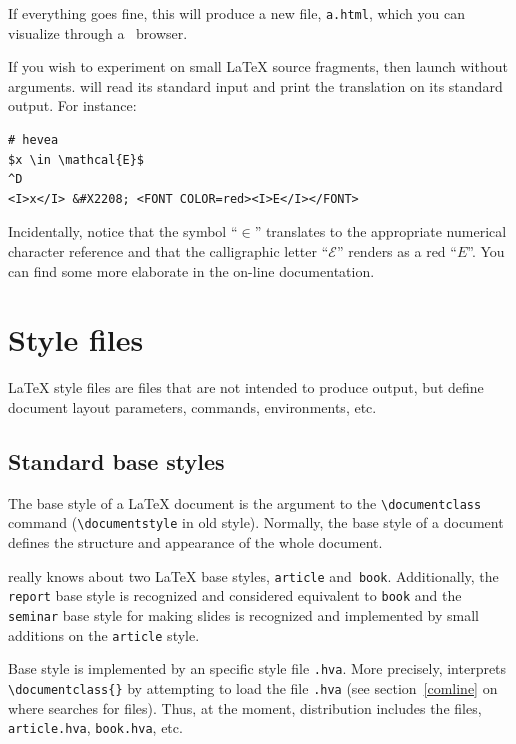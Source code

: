 If everything goes fine, this will produce a new file,
\texttt{a.html}, which you can visualize through  a {\html}~browser.


If you wish to experiment \hevea{} on small \LaTeX{} source fragments,
then launch \hevea{} without arguments. \hevea{} will read its
standard input and print the translation on its standard output.
For instance:
\begin{verbatim}
# hevea
$x \in \mathcal{E}$
^D
<I>x</I> &#X2208; <FONT COLOR=red><I>E</I></FONT>
\end{verbatim}
Incidentally, notice that the symbol ``$\in$'' translates to the
appropriate numerical character reference and that the calligraphic
letter ``$\mathcal{E}$'' renders as a red ``$E$''. You can find some
more elaborate  in
the on-line documentation.

\section{Style files}
\LaTeX{} style files are files that are not intended to produce output, but
define document layout parameters, commands, environments, etc.

\subsection{Standard base styles}

The base style of a \LaTeX{} document is the argument to the
\verb+\documentclass+ command (\verb+\documentstyle+ in old style).
Normally, the base style of a document defines the structure and
appearance of the whole document.



\noindent\hevea{} really knows about two \LaTeX{} base styles,
\texttt{article} and~\texttt{book}.
Additionally, the \texttt{report} base style is recognized and
considered equivalent to \texttt{book} and the
\texttt{seminar} base style for making slides is recognized and
implemented by small additions on the \texttt{article} style.


Base style  is implemented by an \hevea{} specific
style file \verb+.hva+.
More precisely, \hevea{} interprets
\verb+\documentclass{+\verb+}+ by attempting to load
the file \verb+.hva+ (see section~\ref{comline} on where
\hevea{} searches for files).
Thus, at the moment, \hevea{} distribution includes the files,
\texttt{article.hva}, \texttt{book.hva}, etc.


